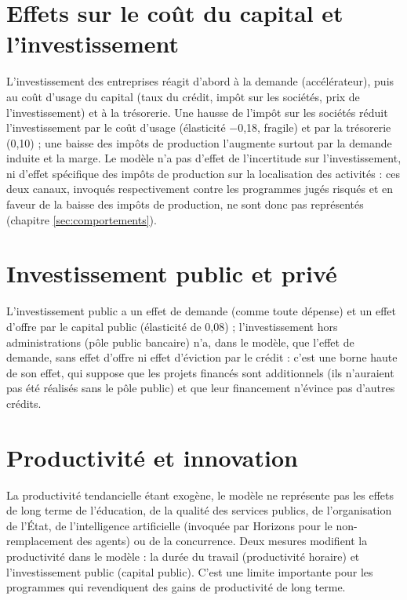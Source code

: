 \documentclass[
  11pt,
  11pt,
  a4paper,
  openany]{book}
\begin{document}
\hypertarget{sec:cout-capital}{%
\section{Effets sur le coût du capital et
l'investissement}\label{sec:cout-capital}}

L'investissement des entreprises réagit d'abord à la demande
(accélérateur), puis au coût d'usage du capital (taux du crédit, impôt
sur les sociétés, prix de l'investissement) et à la trésorerie. Une
hausse de l'impôt sur les sociétés réduit l'investissement par le coût
d'usage (élasticité −0,18, fragile) et par la trésorerie (0,10) ; une
baisse des impôts de production l'augmente surtout par la demande
induite et la marge. Le modèle n'a pas d'effet de l'incertitude sur
l'investissement, ni d'effet spécifique des impôts de production sur la
localisation des activités : ces deux canaux, invoqués respectivement
contre les programmes jugés risqués et en faveur de la baisse des impôts
de production, ne sont donc pas représentés (chapitre
\ref{sec:comportements}).

\hypertarget{sec:invest-pub-priv}{%
\section{Investissement public et privé}\label{sec:invest-pub-priv}}

L'investissement public a un effet de demande (comme toute dépense) et
un effet d'offre par le capital public (élasticité de 0,08) ;
l'investissement hors administrations (pôle public bancaire) n'a, dans
le modèle, que l'effet de demande, sans effet d'offre ni effet
d'éviction par le crédit : c'est une borne haute de son effet, qui
suppose que les projets financés sont additionnels (ils n'auraient pas
été réalisés sans le pôle public) et que leur financement n'évince pas
d'autres crédits.

\hypertarget{sec:productivite}{%
\section{Productivité et innovation}\label{sec:productivite}}

La productivité tendancielle étant exogène, le modèle ne représente pas
les effets de long terme de l'éducation, de la qualité des services
publics, de l'organisation de l'État, de l'intelligence artificielle
(invoquée par Horizons pour le non-remplacement des agents) ou de la
concurrence. Deux mesures modifient la productivité dans le modèle : la
durée du travail (productivité horaire) et l'investissement public
(capital public). C'est une limite importante pour les programmes qui
revendiquent des gains de productivité de long terme.
\end{document}
